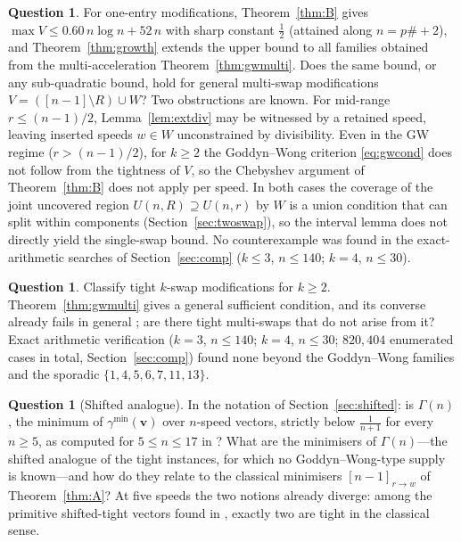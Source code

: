 \documentclass[11pt]{article}
\theoremstyle{definition}
\newtheorem{question}[theorem]{Question}
\begin{document}
\begin{question}\label{q:growth}
For one-entry modifications, Theorem~\ref{thm:B} gives
$\max V\le0.60\,n\log n+52\,n$ with sharp constant $\tfrac12$ (attained
along $n=p\#+2$), and Theorem~\ref{thm:growth} extends the upper bound to
all families obtained from the multi-acceleration
Theorem~\ref{thm:gwmulti}. Does the same bound, or any sub-quadratic
bound, hold
for general multi-swap modifications $V=([n-1]\setminus R)\cup W$? Two
obstructions are known. For mid-range $r\le(n-1)/2$,
Lemma~\ref{lem:extdiv} may be witnessed by a retained speed, leaving
inserted speeds $w\in W$ unconstrained by divisibility. Even in the GW
regime ($r>(n-1)/2$), for $k\ge2$ the Goddyn--Wong criterion
\eqref{eq:gwcond} does not follow from the tightness of $V$, so the
Chebyshev argument of Theorem~\ref{thm:B} does not apply per speed. In
both cases the coverage of the joint uncovered region
$U(n,R)\supseteq U(n,r)$ by $W$ is a union condition that can split
within components (Section~\ref{sec:twoswap}), so the interval lemma does
not directly yield the single-swap bound. No counterexample was found
in the exact-arithmetic searches of Section~\ref{sec:comp} ($k\le3$,
$n\le140$; $k=4$, $n\le30$).
\end{question}

\begin{question}\label{q:kgw}
Classify tight $k$-swap modifications for $k\ge2$. Theorem~\ref{thm:gwmulti}
gives a general sufficient condition, and its converse already fails in
general \cite[Sec.~3]{GoddynWong2006}; are there tight multi-swaps that do
not arise from it? Exact arithmetic verification ($k=3$, $n\le140$; $k=4$,
$n\le30$; $820{,}404$ enumerated cases in total, Section~\ref{sec:comp})
found none beyond the Goddyn--Wong families and the sporadic
$\{1,4,5,6,7,11,13\}$.
\end{question}

\begin{question}[Shifted analogue]\label{q:shifted}
In the notation of Section~\ref{sec:shifted}: is $\Gamma(n)$, the
minimum of $\gamma^{\min}(\mathbf v)$ over $n$-speed vectors, strictly
below $\frac1{n+1}$ for every $n\ge5$, as computed for
$5\le n\le17$ in \cite{BlancoCriadoSantos2026}?  What are the minimisers
of $\Gamma(n)$---the shifted analogue of the tight instances, for which
no Goddyn--Wong-type supply is known---and how do they relate to the
classical minimisers $[n-1]_{r\to w}$ of Theorem~\ref{thm:A}?  At five
speeds the two notions already diverge: among the primitive
shifted-tight vectors found in \cite{AlcantaraCriadoSantos2026}, exactly
two are tight in the classical sense.
\end{question}
\end{document}
